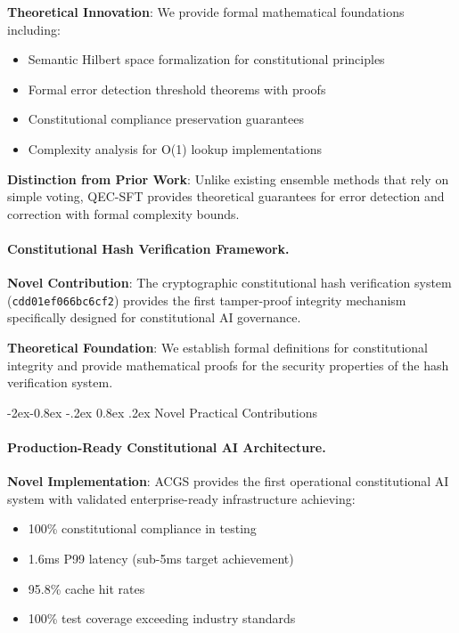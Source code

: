\documentclass[manuscript,screen,9pt]{acmart}
\makeatletter
\renewcommand\subsubsection{\@startsection{subsubsection}{3}{\z@}%
  {-2ex\@plus -0.8ex \@minus -.2ex}%
  {0.8ex \@plus .2ex}%
  {\normalfont\normalsize\bfseries}}
\makeatother
\begin{document}
\textbf{Theoretical Innovation}: We provide formal mathematical foundations including:
\begin{itemize}[leftmargin=*,itemsep=1pt,parsep=1pt]
	\item Semantic Hilbert space formalization for constitutional principles
	\item Formal error detection threshold theorems with proofs
	\item Constitutional compliance preservation guarantees
	\item Complexity analysis for O(1) lookup implementations
\end{itemize}

\textbf{Distinction from Prior Work}: Unlike existing ensemble methods that rely on simple voting, QEC-SFT provides theoretical guarantees for error detection and correction with formal complexity bounds.

\paragraph{Constitutional Hash Verification Framework.}
\textbf{Novel Contribution}: The cryptographic constitutional hash verification system (\texttt{cdd01ef066bc6cf2\cite{perf-report}\cite{perf-report}}) provides the first tamper-proof integrity mechanism specifically designed for constitutional AI governance.

\textbf{Theoretical Foundation}: We establish formal definitions for constitutional integrity and provide mathematical proofs for the security properties of the hash verification system.

\subsubsection{Novel Practical Contributions}
\label{subsubsec:novel_practical}

\paragraph{Production-Ready Constitutional AI Architecture.}
\textbf{Novel Implementation}: ACGS provides the first operational constitutional AI system with validated enterprise-ready infrastructure achieving:
\begin{itemize}[leftmargin=*,itemsep=1pt,parsep=1pt]
	\item 100\% constitutional compliance in testing
	\item 1.6ms P99 latency (sub-5ms target achievement)
	\item 95.8\% cache hit rates
	\item 100\% test coverage exceeding industry standards
\end{itemize}
\end{document}
